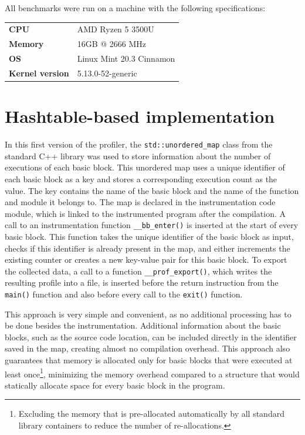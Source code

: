 All benchmarks were run on a machine with the following specifications:

\begin{table}[H]
    \centering
    \begin{tabular}{ll}
    \textbf{CPU} & AMD Ryzen 5 3500U \\
    \textbf{Memory} & 16GB @ 2666 MHz \\
    \textbf{OS} & Linux Mint 20.3 Cinnamon \\
    \textbf{Kernel version} & 5.13.0-52-generic\\
    \end{tabular}
    \label{tab:ccsds-images}
\end{table}

\section{Hashtable-based implementation}
\label{hashtable-impl}

In this first version of the profiler, the \verb|std::unordered_map| class from the standard C++ library was used to store information about the number of executions of each basic block. This unordered map uses a unique identifier of each basic block as a key and stores a corresponding execution count as the value. The key contains the name of the basic block and the name of the function and module it belongs to. The map is declared in the instrumentation code module, which is linked to the instrumented program after the compilation. A call to an instrumentation function \texttt{\_\_bb\_enter()} is inserted at the start of every basic block. This function takes the unique identifier of the basic block as input, checks if this identifier is already present in the map, and either increments the existing counter or creates a new key-value pair for this basic block. To export the collected data, a call to a function \texttt{\_\_prof\_export()}, which writes the resulting profile into a file, is inserted before the return instruction from the \texttt{main()} function and also before every call to the \texttt{exit()} function.

This approach is very simple and convenient, as no additional processing has to be done besides the instrumentation. Additional information about the basic blocks, such as the source code location, can be included directly in the identifier saved in the map, creating almost no compilation overhead. This approach also guarantees that memory is allocated only for basic blocks that were executed at least once\footnote{Excluding the memory that is pre-allocated automatically by all standard library containers to reduce the number of re-allocations.}, minimizing the memory overhead compared to a structure that would statically allocate space for every basic block in the program.

